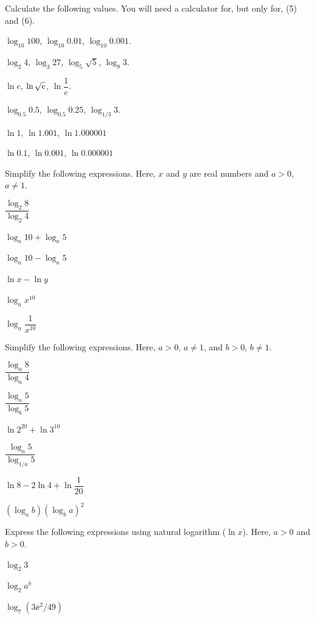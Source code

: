 \documentclass[11pt,pdfa,lastpage]{MishoNote}
\begin{document}
\bigskip
\begin{enumerate}[resume]
  \itemB Calculate the following values. You will need a calculator for, but only for, (5) and (6).
\begin{menumerate}{2}
  \item $\log_{10}100$, $\log_{10}0.01$, $\log_{10}0.001$.
  \item $\log_2 4$, $\log_{3}27$, $\log_5\sqrt{5}$, $\log_{9}3$.
  \item $\ln e$, $\ln \sqrt{\\e}$, $\ln \dfrac{1}{e}$.
  \item $\log_{0.5}0.5$, $\log_{0.5}0.25$, $\log_{1/3}3$.
  \item $\ln 1$, $\ln 1.001$, $\ln 1.000001$
  \item $\ln 0.1$, $\ln 0.001$, $\ln 0.000001$
\end{menumerate}
\itemA Simplify the following expressions. Here, $x$ and $y$ are real numbers and  $a>0$, $a\neq 1$.
\begin{menumerate}{3}
  \item $\dfrac{\log_{2}8}{\log_{2}4}$
  \item $\log_a{10}+\log_a{5}$
  \item $\log_a{10}-\log_a{5}$
  \item $\ln x-\ln y$
  \item $\log_a x^{10}$
  \item $\log_a \dfrac{1}{x^{10}}$
\end{menumerate}
\itemB Simplify the following expressions. Here, $a>0$, $a\neq 1$, and $b>0$, $b\neq 1$.
\begin{menumerate}{3}
  \item $\dfrac{\log_{a}8}{\log_{a}4}$
  \item $\dfrac{\log_{a}5}{\log_{b}5}$
  \item $\ln 2^{20}+\ln 3^{10}$
  \item $\dfrac{\log_{a}5}{\log_{1/a}5}$
  \item $\ln 8-2\ln 4+\ln\dfrac{1}{20}$
  \item $(\log_a b)(\log_b a)^2$
\end{menumerate}
\itemB Express the following expressions using natural logarithm ($\ln x$). Here, $a>0$ and $b>0$.
\begin{menumerate}{3}
  \item $\log_2 3$
  \item $\log_2a^b$
  \item $\log_7(3\ee^2/49)$
\end{menumerate}
\end{enumerate}
\end{document}
